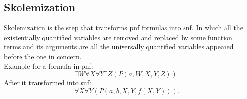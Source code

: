 \subsection{Skolemization}\label{sub:c2s1s3}
Skolemization is the step that transforms \ac{pnf} formulas into \ac{snf}.
In which all the existentially quantified variables are removed and replaced by some function terms and its arguments are all the universally quantified variables appeared before the one in concern.\\
Example for a formula in \ac{pnf}:\newline
\begin{displaymath}
\exists W \forall X \forall Y \exists Z  \left(P(a,W,X,Y,Z)\right).  
\end{displaymath}\newline
After it transformed into \ac{snf}:\newline
\begin{displaymath}
\forall X \forall Y  \left(P(a,b,X,Y,f(X,Y))\right).  
\end{displaymath}

